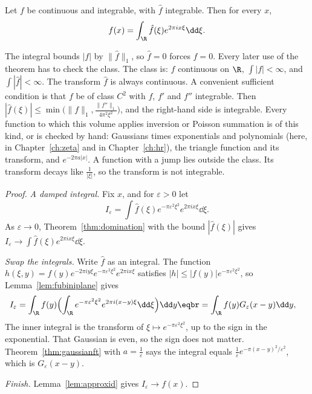 \begin{theorem}\label{thm:ftinversion}
Let $f$ be continuous and integrable, with $\hat f$ integrable. Then for every $x$,
\[
f(x)=\int_{\R}\hat f(\xi)e^{2\pi ix\xi}\dd\xi.
\]
\end{theorem}

The integral bounds $|f|$ by $\|\hat f\|_1$, so $\hat f=0$ forces $f=0$. Every later use of the theorem has to check the class. The class is: $f$ continuous on $\R$, $\int|f|<\infty$, and $\int|\hat f|<\infty$. The transform $\hat f$ is always continuous. A convenient sufficient condition is that $f$ be of class $C^2$ with $f$, $f'$ and $f''$ integrable. Then $|\hat f(\xi)|\le\min\bigl(\|f\|_1,\frac{\|f''\|_1}{4\pi^2\xi^2}\bigr)$, and the right-hand side is integrable. Every function to which this volume applies inversion or Poisson summation is of this kind, or is checked by hand: Gaussians times exponentials and polynomials (here, in Chapter~\ref{ch:zeta} and in Chapter~\ref{ch:hr}), the triangle function and its transform, and $e^{-2\pi a|x|}$. A function with a jump lies outside the class. Its transform decays like $\frac1{|\xi|}$, so the transform is not integrable.
\begin{proof}
\emph{A damped integral.} Fix $x$, and for $\varepsilon>0$ let
\[
I_\varepsilon=\int\hat f(\xi)e^{-\pi\varepsilon^2\xi^2}e^{2\pi ix\xi}\dd\xi.
\]
As $\varepsilon\to0$, Theorem~\ref{thm:domination} with the bound $|\hat f(\xi)|$ gives $I_\varepsilon\to\int\hat f(\xi)e^{2\pi ix\xi}\dd\xi$.

\emph{Swap the integrals.} Write $\hat f$ as an integral. The function $h(\xi,y)=f(y)e^{-2\pi iy\xi}e^{-\pi\varepsilon^2\xi^2}e^{2\pi ix\xi}$ satisfies $|h|\le|f(y)|e^{-\pi\varepsilon^2\xi^2}$, so Lemma~\ref{lem:fubiniplane} gives
\[
\begin{aligned}I_\varepsilon&=\int_{\R}f(y)\Bigl(\int_{\R}e^{-\pi\varepsilon^2\xi^2}e^{2\pi i(x-y)\xi}\dd\xi\Bigr)\dd y\eqbr=\int_{\R}f(y)G_\varepsilon(x-y)\dd y,\end{aligned}
\]
The inner integral is the transform of $\xi\mapsto e^{-\pi\varepsilon^2\xi^2}$, up to the sign in the exponential. That Gaussian is even, so the sign does not matter. Theorem~\ref{thm:gaussianft} with $a=\frac1\varepsilon$ says the integral equals $\frac1\varepsilon e^{-\pi(x-y)^2/\varepsilon^2}$, which is $G_\varepsilon(x-y)$.

\emph{Finish.} Lemma~\ref{lem:approxid} gives $I_\varepsilon\to f(x)$.
\end{proof}

